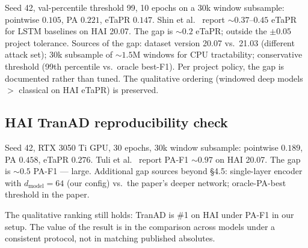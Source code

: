 Seed 42, val-percentile threshold 99, 10 epochs on a 30k window subsample: pointwise $0.105$, PA $0.221$, eTaPR $0.147$.  Shin et al.~\cite{shin2020hai} report $\sim 0.37$--$0.45$ eTaPR for LSTM baselines on HAI 20.07.  The gap is $\sim 0.2$ eTaPR; outside the $\pm 0.05$ project tolerance.  Sources of the gap: dataset version 20.07 vs.\ 21.03 (different attack set); 30k subsample of $\sim 1.5\mathrm{M}$ windows for CPU tractability; conservative threshold (99th percentile vs.\ oracle best-F1).  Per project policy, the gap is documented rather than tuned.  The qualitative ordering (windowed deep models $>$ classical on HAI eTaPR) is preserved.

\subsection{HAI TranAD reproducibility check}
\label{sec:tranad-repro}

Seed 42, RTX 3050 Ti GPU, 30 epochs, 30k window subsample: pointwise $0.189$, PA $0.458$, eTaPR $0.276$.  Tuli et al.~\cite{tuli2022tranad} report PA-F1 $\sim 0.97$ on HAI 20.07.  The gap is $\sim 0.5$ PA-F1 --- large.  Additional gap sources beyond \S4.5: single-layer encoder with $d_{\text{model}} = 64$ (our config) vs.\ the paper's deeper network; oracle-PA-best threshold in the paper.

The qualitative ranking still holds: TranAD is \#1 on HAI under PA-F1 in our setup.  The value of the result is in the comparison across models under a consistent protocol, not in matching published absolutes.
